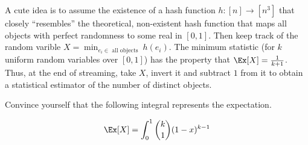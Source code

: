 \documentclass[../main.tex]{subfiles}
\begin{document}
\begin{remark}
    A cute idea is to assume the existence of a hash function $h: [n] \rightarrow [n^3]$ that closely ``resembles'' the theoretical, non-existent hash function that maps all objects with perfect randomness to some real in $[0,1]$. Then keep track of the random varible $X = \min_{e_{i} \in \text{ all objects }} h(e_{i})$. The minimum statistic (for $k$ uniform random variables over $[0,1]$) has the property that $\Ex[X] = \frac{1}{k+1}$. Thus, at the end of streaming, take $X$, invert it and subtract $1$ from it to obtain a statistical estimator of the number of distinct objects.

    Convince yourself that the following integral represents the expectation.

    \[
        \Ex[X] = \int_{0}^{1}\binom{k}{1} (1 - x)^{k-1}
    \]

\end{remark}
\end{document}
